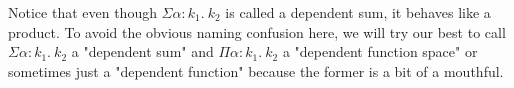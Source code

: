 \documentclass{article}
\begin{document}
Notice that even though $\Sigma \alpha : k_1. \ k_2$ is called a dependent sum,
it behaves like a product. To avoid the obvious naming confusion here, we will
try our best to call $\Sigma \alpha : k_1. \ k_2$ a "dependent sum" and $\Pi
\alpha : k_1. \ k_2$ a "dependent function space" or sometimes just a "dependent
function" because the former is a bit of a mouthful.
\end{document}
